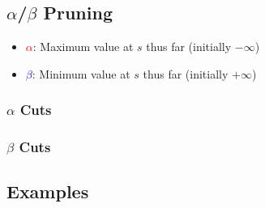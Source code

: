 \subsection{$\alpha$/$\beta$ Pruning}
\begin{definition}
    \begin{itemize}
        \item \textcolor{red}{$\alpha$}: Maximum value at $s$ thus far (initially $-\infty$)
        \item \textcolor{blue}{$\beta$}: Minimum value at $s$ thus far (initially $+\infty$)
    \end{itemize}
\end{definition}

\subsubsection{$\alpha$ Cuts}
\begin{notes}
\end{notes}

\subsubsection{$\beta$ Cuts}
\begin{notes}
\end{notes}

\subsection{Examples}
\begin{example}
\end{example}

